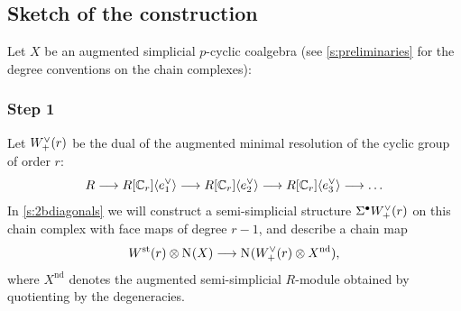 %
%
%
%
%
%

\subsection*{Sketch of the construction} Let $X$ be an augmented simplicial $p$-cyclic coalgebra (see \cref{s:preliminaries} for the degree conventions on the chain complexes): 
\subsubsection*{Step 1} Let $W^\vee_+(r)$ be the dual of the augmented minimal resolution of the cyclic group of order $r$:
	\[
		R \longrightarrow R[\mathbb{C}_r]\langle e_1^{\vee}\rangle \longrightarrow R[\mathbb{C}_r]\langle e_2^{\vee}\rangle 
		\longrightarrow R[\mathbb{C}_r]\langle e_3^{\vee}\rangle \longrightarrow \ldots
	\]
In \cref{s:2bdiagonals} we will construct a semi-simplicial structure $\Sigma^{\bullet} W^\vee_+(r)$ on this chain complex with face maps of degree $r-1$, and describe a chain map
\begin{equation}\label{eq:uno}
	W^{\mathrm{st}}_{}(r)\otimes \operatorname{N}_{}(X) \longrightarrow \operatorname{N}_{}(W^\vee_+(r)\otimes X^{\mathrm{nd}}),
\end{equation}
where $X^{\mathrm{nd}}$ denotes the augmented semi-simplicial $R$-module obtained by quotienting by the degeneracies.
